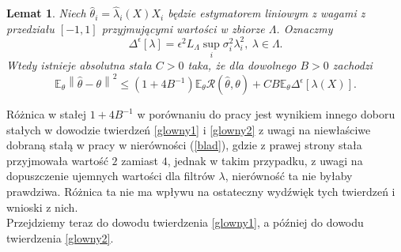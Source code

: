 \documentclass[man,mfiu]{mgrwms}
\newcommand{\norm}[1]{\left\lVert#1\right\rVert}
\newtheorem{lm}{Lemat}[chapter]
\begin{document}
\begin{lm}\label{lem3}
Niech $\hat{\theta}_i=\hat{\lambda}_i(X)X_i$ będzie estymatorem liniowym z wagami z przedziału $[-1,1]$ przyjmującymi wartości w zbiorze $\Lambda$. Oznaczmy  
\begin{displaymath}
\Delta^{\epsilon}[\lambda]=\epsilon^2L_{\Lambda}\sup_i\sigma_i^2\lambda_i^2,\ \lambda\in \Lambda.
\end{displaymath}
Wtedy istnieje absolutna stała $C>0$ taka, że dla dowolnego $B>0$ zachodzi
\begin{displaymath}
\mathbb{E}_{\theta}\norm{\hat{\theta}-\theta}^2\leq (1+4B^{-1})\mathbb{E}_{\theta}\mathcal{R}(\hat{\theta},\theta)+CB\mathbb{E}_{\theta}\Delta^{\epsilon}[\lambda (X)].
\end{displaymath}
\end{lm}
Różnica w stałej $1+4B^{-1}$ w porównaniu do pracy \cite{cavalier1} jest wynikiem innego doboru stałych w dowodzie twierdzeń \ref{glowny1} i \ref{glowny2} z uwagi na niewłaściwe dobraną stałą w pracy \cite{cavalier1} w nierówności (\ref{blad}), gdzie z prawej strony stała przyjmowała wartość $2$ zamiast $4$, jednak w takim przypadku, z uwagi na dopuszczenie ujemnych wartości dla filtrów $\lambda$, nierówność ta nie byłaby prawdziwa. Różnica ta nie ma wpływu na ostateczny wydźwięk tych twierdzeń i wnioski z nich.\\
\indent Przejdziemy teraz do dowodu twierdzenia \ref{glowny1}, a później do dowodu twierdzenia \ref{glowny2}.
\end{document}
